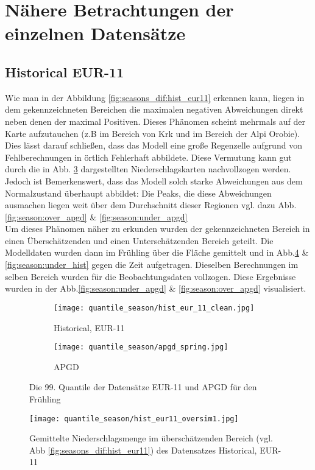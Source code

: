 \section{Nähere Betrachtungen der einzelnen Datensätze}
\subsection{Historical EUR-11} \label{subsec:hist_eur11}
Wie man in der Abbildung \ref{fig:seasons_dif:hist_eur11} erkennen kann, liegen in dem gekennzeichneten Bereichen die maximalen negativen Abweichungen direkt neben denen der maximal Positiven. Dieses Phänomen scheint mehrmals auf der Karte aufzutauchen (z.B im Bereich von Krk und im Bereich der Alpi Orobie). Dies lässt darauf schließen, dass das Modell eine große Regenzelle aufgrund von Fehlberechnungen in örtlich Fehlerhaft abbildete. Diese Vermutung kann gut durch die in Abb. \ref{fig:seasons_hist} dargestellten Niederschlagskarten nachvollzogen werden. Jedoch ist Bemerkenswert, dass das Modell solch starke Abweichungen aus dem Normalzustand überhaupt abbildet: Die Peaks, die diese Abweichungen ausmachen liegen weit über dem Durchschnitt dieser Regionen vgl. dazu Abb.\ref{fig:season:over_apgd} \& \ref{fig:season:under_apgd}\\
Um dieses Phänomen näher zu erkunden wurden der gekennzeichneten Bereich in einen Überschätzenden und einen Unterschätzenden Bereich geteilt. Die Modelldaten wurden dann im Frühling über die Fläche gemittelt und in Abb.\ref{fig:season:over_hist} \& \ref{fig:season:under_hist} gegen die Zeit aufgetragen. Dieselben Berechnungen im selben Bereich wurden für die Beobachtungsdaten vollzogen. Diese Ergebnisse wurden in der Abb.\ref{fig:season:under_apgd} \& \ref{fig:season:over_apgd} visualisiert.\\
\begin{figure}
	\begin{subfigure}{0.49\textwidth}
		\texttt{[image: quantile\_season/hist\_eur\_11\_clean.jpg]}
		\caption{Historical, EUR-11}
		\label{fig:seasons_hist:hist}
	\end{subfigure}
	\begin{subfigure}{0.49\textwidth}
		\texttt{[image: quantile\_season/apgd\_spring.jpg]}
		\caption{APGD}
		\label{fig:seasons_hist:apgd}
	\end{subfigure}
	\caption{Die 99. Quantile der Datensätze EUR-11 und APGD für den Frühling}
	\label{fig:seasons_hist}
\end{figure}
\begin{figure}
		\texttt{[image: quantile\_season/hist\_eur11\_oversim1.jpg]}
		\caption{Gemittelte Niederschlagsmenge im überschätzenden Bereich (vgl. Abb \ref{fig:seasons_dif:hist_eur11}) des Datensatzes Historical, EUR-11}
		\label{fig:season:over_hist}
\end{figure}
